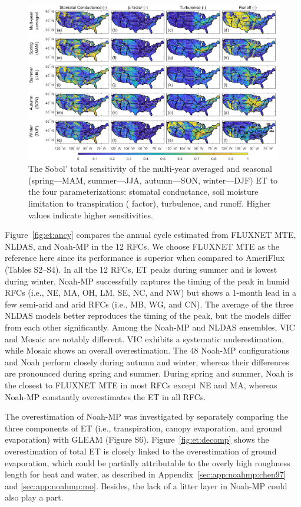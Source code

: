 \documentclass[essd, manuscript]{copernicus}
\begin{document}
\begin{figure}[t]
  \includegraphics[width=17cm]{fig/fig14.pdf}
  \caption{The Sobol' total sensitivity of the multi-year averaged and seasonal (spring---MAM, summer---JJA, autumn---SON, winter---DJF) ET to the four parameterizations: stomatal conductance, soil moisture limitation to transpiration (\beta{} factor), turbulence, and runoff. Higher values indicate higher sensitivities.}
  \label{fig:et:sens}
\end{figure}

Figure~\ref{fig:et:ancy} compares the annual cycle estimated from FLUXNET MTE, NLDAS, and Noah-MP in the 12 RFCs. We choose FLUXNET MTE as the reference here since its performance is superior when compared to AmeriFlux (Tables S2--S4). In all the 12 RFCs, ET peaks during summer and is lowest during winter. Noah-MP successfully captures the timing of the peak in humid RFCs (i.e., NE, MA, OH, LM, SE, NC, and NW) but shows a 1-month lead in a few semi-arid and arid RFCs (i.e., MB, WG, and CN). The average of the three NLDAS models better reproduces the timing of the peak, but the models differ from each other significantly. Among the Noah-MP and NLDAS ensembles, VIC and Mosaic are notably different. VIC exhibits a systematic underestimation, while Mosaic shows an overall overestimation. The 48 Noah-MP configurations and Noah perform closely during autumn and winter, whereas their differences are pronounced during spring and summer. During spring and summer, Noah is the closest to FLUXNET MTE in most RFCs except NE and MA, whereas Noah-MP constantly overestimates the ET in all RFCs.

The overestimation of Noah-MP was investigated by separately comparing the three components of ET (i.e., transpiration, canopy evaporation, and ground evaporation) with GLEAM (Figure S6). Figure~\ref{fig:et:decomp} shows the overestimation of total ET is closely linked to the overestimation of ground evaporation, which could be partially attributable to the overly high roughness length for heat and water, as described in Appendix~\ref{sec:app:noahmp:chen97} and \ref{sec:app:noahmp:mo}. Besides, the lack of a litter layer \citep{decker2017JAMES} in Noah-MP could also play a part.
\end{document}
